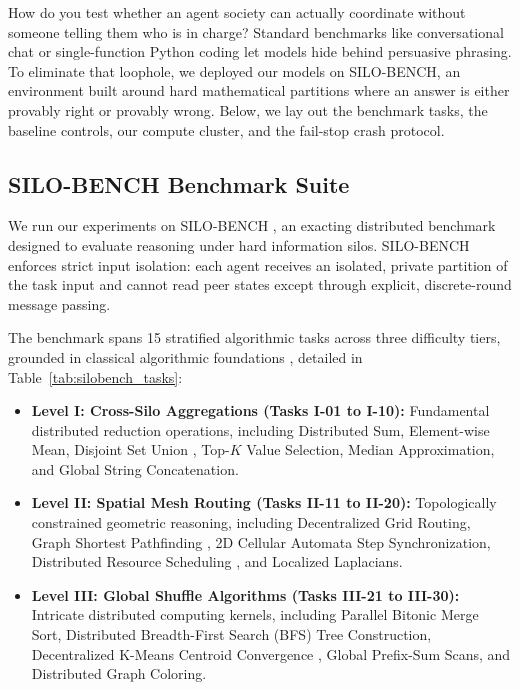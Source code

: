 \documentclass{ieeeaccess}
\begin{document}
How do you test whether an agent society can actually coordinate without someone telling them who is in charge? Standard benchmarks like conversational chat or single-function Python coding let models hide behind persuasive phrasing. To eliminate that loophole, we deployed our models on SILO-BENCH, an environment built around hard mathematical partitions where an answer is either provably right or provably wrong. Below, we lay out the benchmark tasks, the baseline controls, our compute cluster, and the fail-stop crash protocol.

\subsection{SILO-BENCH Benchmark Suite}
We run our experiments on SILO-BENCH \cite{john2026silobench}, an exacting distributed benchmark designed to evaluate reasoning under hard information silos. SILO-BENCH enforces strict input isolation: each agent receives an isolated, private partition of the task input and cannot read peer states except through explicit, discrete-round message passing.

The benchmark spans 15 stratified algorithmic tasks across three difficulty tiers, grounded in classical algorithmic foundations \cite{cormen2022introduction}, detailed in Table~\ref{tab:silobench_tasks}:
\begin{itemize}
    \item \textbf{Level I: Cross-Silo Aggregations (Tasks I-01 to I-10):} Fundamental distributed reduction operations, including Distributed Sum, Element-wise Mean, Disjoint Set Union \cite{tarjan1975efficiency}, Top-$K$ Value Selection, Median Approximation, and Global String Concatenation.
    \item \textbf{Level II: Spatial Mesh Routing (Tasks II-11 to II-20):} Topologically constrained geometric reasoning, including Decentralized Grid Routing, Graph Shortest Pathfinding \cite{dijkstra1959note, bellman1958routing}, 2D Cellular Automata Step Synchronization, Distributed Resource Scheduling \cite{ford1956network, hopcroft1973algorithm}, and Localized Laplacians.
    \item \textbf{Level III: Global Shuffle Algorithms (Tasks III-21 to III-30):} Intricate distributed computing kernels, including Parallel Bitonic Merge Sort, Distributed Breadth-First Search (BFS) Tree Construction, Decentralized K-Means Centroid Convergence \cite{macqueen1967kmeans}, Global Prefix-Sum Scans, and Distributed Graph Coloring.
\end{itemize}
\end{document}
